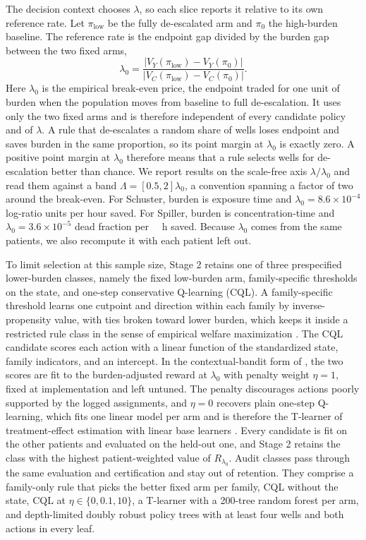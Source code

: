 \documentclass[conference]{IEEEtran}
\begin{document}
The decision context chooses \(\lambda\), so each slice reports it relative to its own reference rate. Let \(\pi_{\mathrm{low}}\) be the fully de-escalated arm and \(\pi_0\) the high-burden baseline. The reference rate is the endpoint gap divided by the burden gap between the two fixed arms,
\begin{equation}
\lambda_0=\frac{|V_Y(\pi_{\mathrm{low}})-V_Y(\pi_0)|}{|V_C(\pi_{\mathrm{low}})-V_C(\pi_0)|}.
\end{equation}
Here \(\lambda_0\) is the empirical break-even price, the endpoint traded for one unit of burden when the population moves from baseline to full de-escalation. It uses only the two fixed arms and is therefore independent of every candidate policy and of \(\lambda\). A rule that de-escalates a random share of wells loses endpoint and saves burden in the same proportion, so its point margin at \(\lambda_0\) is exactly zero. A positive point margin at \(\lambda_0\) therefore means that a rule selects wells for de-escalation better than chance. We report results on the scale-free axis \(\lambda/\lambda_0\) and read them against a band \(\Lambda=[0.5,2]\lambda_0\), a convention spanning a factor of two around the break-even. For Schuster, burden is exposure time and \(\lambda_0=8.6\times10^{-4}\) log-ratio units per hour saved. For Spiller, burden is concentration-time and \(\lambda_0=3.6\times10^{-5}\) dead fraction per \si{\micro\molar\hour} saved. Because \(\lambda_0\) comes from the same patients, we also recompute it with each patient left out.

To limit selection at this sample size, Stage 2 retains one of three prespecified lower-burden classes, namely the fixed low-burden arm, family-specific thresholds on the state, and one-step conservative Q-learning (CQL). A family-specific threshold learns one cutpoint and direction within each family by inverse-propensity value, with ties broken toward lower burden, which keeps it inside a restricted rule class in the sense of empirical welfare maximization \cite{kitagawa2018}. The CQL candidate scores each action with a linear function of the standardized state, family indicators, and an intercept. In the contextual-bandit form of \cite{kumar2020}, the two scores are fit to the burden-adjusted reward at \(\lambda_0\) with penalty weight \(\eta=1\), fixed at implementation and left untuned. The penalty discourages actions poorly supported by the logged assignments, and \(\eta=0\) recovers plain one-step Q-learning, which fits one linear model per arm and is therefore the T-learner of treatment-effect estimation with linear base learners \cite{kunzel2019}. Every candidate is fit on the other patients and evaluated on the held-out one, and Stage 2 retains the class with the highest patient-weighted value of \(R_{\lambda_0}\). Audit classes pass through the same evaluation and certification and stay out of retention. They comprise a family-only rule that picks the better fixed arm per family, CQL without the state, CQL at \(\eta\in\{0,0.1,10\}\), a T-learner with a 200-tree random forest per arm, and depth-limited doubly robust policy trees \cite{athey2021, zhou2018} with at least four wells and both actions in every leaf.
\end{document}
